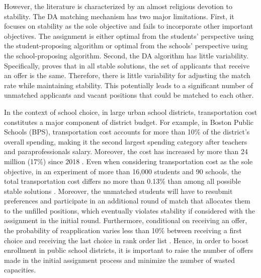 \documentclass[11pt]{article}
\begin{document}
However, the literature is characterized by an almost religious devotion to stability. 
The DA matching mechanism has two major limitations. First, it focuses on stability as the sole objective and fails to incorporate other important objectives. The assignment is either optimal from the students' perspective using the student-proposing algorithm or optimal from the schools' perspective using the school-proposing algorithm. 
Second, the DA algorithm has little variability. Specifically,  \cite{roth1986} proves that in all stable solutions, the set of applicants that receive an offer is the same. Therefore, there is little variability for adjusting the match rate while maintaining stability. This potentially leads to a significant number of unmatched applicants and vacant positions that could be matched to each other.

In the context of school choice, in large urban school districts, transportation cost constitutes a major component of district budget. For example, in Boston Public Schools (BPS), transportation cost accounts for more than 10\% of the district's overall spending, making it the second largest spending category after teachers and paraprofessionals salary. Moreover, the cost has increased by more than 24 million (17\%) since 2018 \citep{bps_review_2022}. 
Even when considering transportation cost as the sole objective, in an experiment of more than 16,000 students and 90 schools, the total transportation cost differs no more than 0.13\% than among all possible stable solutions \citep{papalexopoulos2022}. 
Moreover, the unmatched students will have to resubmit preferences and participate in an additional round of match that allocates them to the unfilled positions, which eventually violates stability if considered with the assignment in the initial round. Furthermore, conditional on receiving an offer, the probability of reapplication varies less than 10\% between receiving a first choice and receiving the last choice in rank order list \citep{narita2018}. Hence, in order to boost enrollment in public school districts, it is important to raise the number of offers made in the initial assignment process and minimize the number of wasted capacities. 

\end{document}
